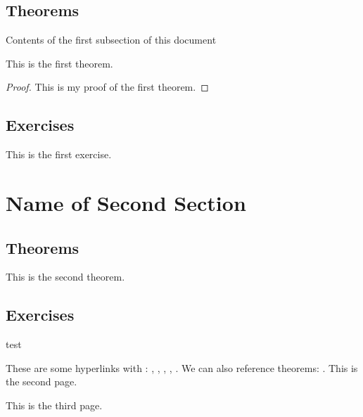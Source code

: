 \subsection{Theorems}
Contents of the first subsection of this document
\begin{theorem}\label{thm:1.1}
    This is the first theorem.
\end{theorem}
\begin{proof}
    This is my proof of the first theorem.
\end{proof}
%
\subsection{Exercises}
\begin{exercise}\label{ex:1.1}
This is the first exercise.
\end{exercise}
% 
% 
\section{Name of Second Section}
\subsection{Theorems}
\begin{theorem}
    This is the second theorem.
\end{theorem}
\subsection{Exercises}
\begin{exercise}\label{ex:1.2}
    test
\end{exercise}
These are some hyperlinks with : , , , , . We can also reference theorems: . 
\newpage
This is the second page.

\newpage
This is the third page.